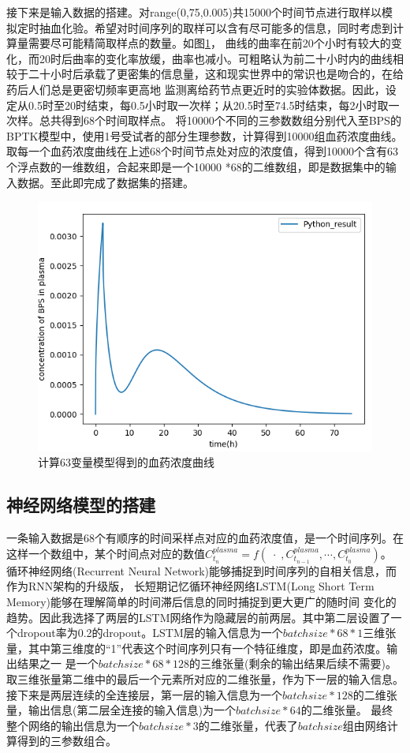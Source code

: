 \documentclass{article}
\begin{document}
接下来是输入数据的搭建。对range(0,75,0.005)共15000个时间节点进行取样以模拟定时抽血化验。希望对时间序列的取样可以含有尽可能多的信息，同时考虑到计算量需要尽可能精简取样点的数量。如图\ref{fig6}，
曲线的曲率在前20个小时有较大的变化，而20时后曲率的变化率放缓，曲率也减小。可粗略认为前二十小时内的曲线相较于二十小时后承载了更密集的信息量，这和现实世界中的常识也是吻合的，在给药后人们总是更密切频率更高地
监测离给药节点更近时的实验体数据。因此，设定从0.5时至20时结束，每0.5小时取一次样；从20.5时至74.5时结束，每2小时取一次样。总共得到68个时间取样点。
将10000个不同的三参数数组分别代入至BPS的BPTK模型中，使用1号受试者的部分生理参数，计算得到10000组血药浓度曲线。取每一个血药浓度曲线在上述68个时间节点处对应的浓度值，得到10000个含有63个浮点数的一维数组，合起来即是一个10000
*68的二维数组，即是数据集中的输入数据。至此即完成了数据集的搭建。
\begin{figure}[H]
  \centering
  \includegraphics[scale=0.5]{pic6.png}
  \caption{计算63变量模型得到的血药浓度曲线}
  \label{fig6}
\end{figure}



\subsection*{神经网络模型的搭建}

一条输入数据是68个有顺序的时间采样点对应的血药浓度值，是一个时间序列。在这样一个数组中，某个时间点对应的数值$C^{plasma}_{t_{n}} = f(\;\cdot\; ,C^{plasma}_{t_{n-1}},\cdots,C^{plasma}_{t_{0}})$。
循环神经网络(Recurrent Neural Network)能够捕捉到时间序列的自相关信息，而作为RNN架构的升级版， 长短期记忆循环神经网络LSTM(Long Short Term Memory)能够在理解简单的时间滞后信息的同时捕捉到更大更广的随时间
变化的趋势。因此我选择了两层的LSTM网络作为隐藏层的前两层。其中第二层设置了一个dropout率为0.2的dropout。LSTM层的输入信息为一个$batchsize*68*1$三维张量，其中第三维度的“1”代表这个时间序列只有一个特征维度，即是血药浓度。输出结果之一
是一个$batchsize*68*128$的三维张量(剩余的输出结果后续不需要)。取三维张量第二维中的最后一个元素所对应的二维张量，作为下一层的输入信息。
接下来是两层连续的全连接层，第一层的输入信息为一个$batchsize*128$的二维张量，输出信息(第二层全连接的输入信息)为一个$batchsize*64$的二维张量。
最终整个网络的输出信息为一个$batchsize*3$的二维张量，代表了$batchsize$组由网络计算得到的三参数组合。
\end{document}
